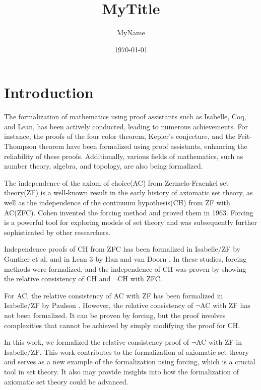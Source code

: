 \documentclass{report}
\begin{document}
\title{MyTitle}
\author{MyName}
\date{\today}
\maketitle


\clearpage
\tableofcontents
\clearpage
\chapter{Introduction}

The formalization of mathematics using proof assistants such as Isabelle, Coq, and Lean, has been actively conducted, leading to numerous achievements. 
For instance, the proofs of the four color theorem, Kepler's conjecture, and the Feit-Thompson theorem have been formalized using proof assistants, enhancing the reliability of these proofs. 
Additionally, various fields of mathematics, such as number theory, algebra, and topology, are also being formalized.

The independence of the axiom of choice(AC) from Zermelo-Fraenkel set theory(ZF) is a well-known result in the early history of axiomatic set theory,
as well as the independence of the continuum hypothesis(CH) from ZF with AC(ZFC).
Cohen invented the forcing method and proved them in 1963.
Forcing is a powerful tool for exploring models of set theory and was subsequently further sophisticated by other researchers.

Independence proofs of CH from ZFC has been formalized in Isabelle/ZF by Gunther et al. \cite{gunther_independence} and in Lean 3 by Han and van Doorn \cite{flypitch}.
In these studies, forcing methods were formalized, and the independence of CH was proven by 
showing the relative consistency of CH and $\neg$CH with ZFC.

For AC, the relative consistency of AC with ZF has been formalized in Isabelle/ZF by Paulson \cite{paulson_AC_consistency}.
However, the relative consistency of $\neg$AC with ZF has not been formalized.
It can be proven by forcing, but the proof involves complexities that cannot be achieved by simply modifying the proof for CH.

In this work, we formalized the relative consistency proof of $\neg$AC with ZF in Isabelle/ZF. 
This work contributes to the formalization of axiomatic set theory and 
serves as a new example of the formalization using forcing, which is a crucial tool in set theory.
It also may provide insights into how the formalization of axiomatic set theory could be advanced.
\end{document}
